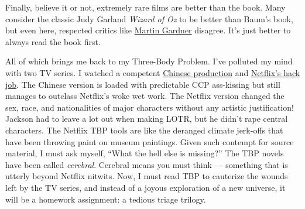 Finally, believe it or not, extremely rare films are
better than the book. Many consider the classic Judy Garland
\emph{Wizard of Oz} to be better than Baum's book, but even here,
respected critics like \href{https://www.goodreads.com/book/show/1125174.The_Wizard_of_Oz_and_Who_He_Was}{Martin Gardner} disagree.
It's just better to always read the book first.

All of which brings me back to my Three-Body Problem. I've polluted my
mind with two TV series. I watched a competent
\href{https://en.wikipedia.org/wiki/Three-Body}{Chinese production} and
\href{https://www.netflix.com/title/81024821}{Netflix's hack job}. The
Chinese version is loaded with predictable CCP ass-kissing but still
manages to outclass Netflix's woke wet work. The Netflix version changed
the sex, race, and nationalities of major characters without any
artistic justification! Jackson had to leave a lot out when making
LOTR, but he didn't rape central characters. The Netflix TBP tools are
like the deranged climate jerk-offs that have been throwing paint on
museum paintings. Given such contempt for source material, I must ask
myself, ``What the hell else is missing?'' The TBP novels have been
called \emph{cerebral}. Cerebral means you must think --- something that
is utterly beyond Netflix nitwits. Now, I must read TBP to cauterize the
wounds left by the TV series, and instead of a joyous exploration of a
new universe, it will be a homework assignment: a tedious triage trilogy.

%
 

